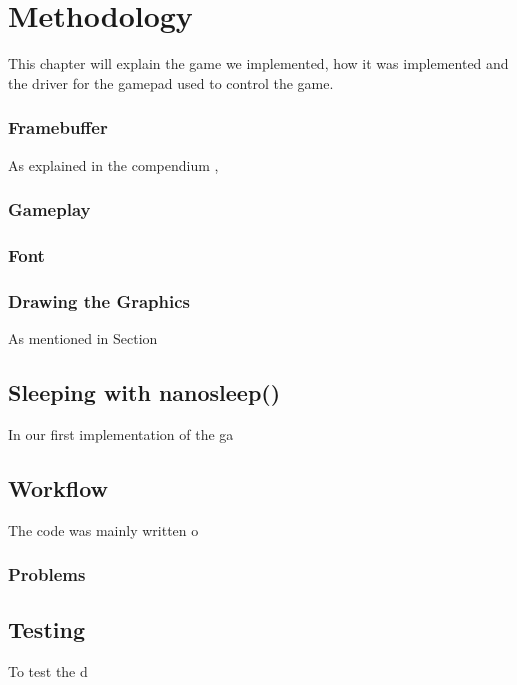\chapter{Methodology}

This chapter will explain the game we implemented, how it was implemented and the driver for the gamepad used to control the game.


\subsection{Framebuffer}
\label{sec:framebuffer}
As explained in the compendium \cite{compendium}, 


\subsection{Gameplay}



\subsection{Font}



\subsection{Drawing the Graphics}
As mentioned in Section 
\section{Sleeping with nanosleep()}
In our first implementation of the ga
\section{Workflow}
The code was mainly written o
\subsection{Problems}

\section{Testing}
To test the d